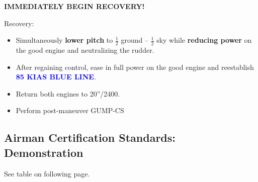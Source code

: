 \textbf{IMMEDIATELY BEGIN RECOVERY!}

Recovery:
\begin{itemize}[label={}]
\item Simultaneously \textbf{lower pitch} to $\frac{1}{2}$ ground – $\frac{1}{2}$ sky while \textbf{reducing power} on the good engine and neutralizing the rudder.
\item After regaining control, ease in full power on the good engine and reestablish\\\textbf{\textcolor{blue}{85 KIAS BLUE LINE}}.
\item Return both engines to 20''/2400.
\item Perform post-maneuver GUMP-CS
\end{itemize}

\subsection{Airman Certification Standards: \vmc Demonstration}

See table on following page.

